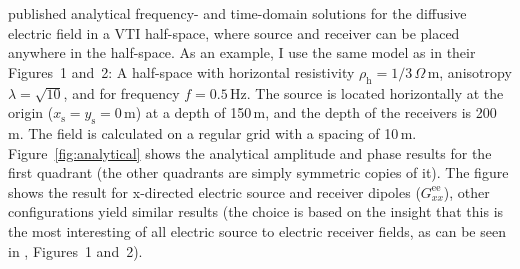 \documentclass[manuscript,revised]{geophysics}
\begin{document}
\cite{PIER.10.Slob} published analytical frequency- and time-domain solutions
for the diffusive electric field in a VTI half-space, where source and receiver
can be placed anywhere in the half-space. As an example, I use the same model
as \cite{GEO.15.Hunziker} in their Figures~1 and~2: A half-space with
horizontal resistivity $\rho_\mathrm{h} = 1/3\,\Omega$\,m, anisotropy $\lambda
= \sqrt{10}$, and for frequency $f = 0.5\,$Hz. The source is located
horizontally at the origin ($x_\mathrm{s} = y_\mathrm{s} = 0\,$m) at a depth of
150\,m, and the depth of the receivers is 200\,m. The field is calculated on a
regular grid with a spacing of 10\,m. Figure~\ref{fig:analytical} shows the
analytical amplitude and phase results for the first quadrant (the other
quadrants are simply symmetric copies of it).
%
%
The figure shows the result for x-directed electric source and receiver dipoles
($G^\mathrm{ee}_{xx}$), other configurations yield similar results (the choice
is based on the insight that this is the most interesting of all electric
source to electric receiver fields, as can be seen in \cite{GEO.15.Hunziker},
Figures~1 and~2).
\end{document}

